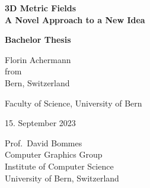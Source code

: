 \documentclass[a4paper,twoside,openright,11pt]{report}
\newcommand{\thesistitle}{3D Metric Fields}
\newcommand{\thesisauthor}{Florin Achermann}
\newcommand{\thesisauthororigin}{Bern, Switzerland}
\newcommand{\thesisleiter}{Prof.\ David Bommes}
\newcommand{\thesissubtitle}{A Novel Approach to a New Idea}
\newcommand{\thesisdate}{15. September 2023}
\begin{document}

\begin{titlepage}  
  \thispagestyle{empty}

  \begin{center}  
    \begin{figure}[t]  
      \vspace{1in}     
    \end{figure}
    
    {\bfseries\Huge \thesistitle \\[2mm]
      \Large \thesissubtitle}\\
    \vspace{1.5cm}

    {\bfseries\LARGE Bachelor Thesis}\\
    \vspace{1.5cm}
    
    {\Large \thesisauthor\\[2mm]
      from\\[2mm]
      \thesisauthororigin}\\
    \vspace{1.5cm}

    {\Large Faculty of Science, University of Bern}\\
    \vspace{1.5cm}

    {\Large \thesisdate}\\
    \vspace{1.5cm}

    \vspace*{\fill}
    {\Large
      \thesisleiter\\
      Computer Graphics Group\\
      Institute of Computer Science\\
      University of Bern, Switzerland\\}
  \end{center}
\end{titlepage}
\end{document}
